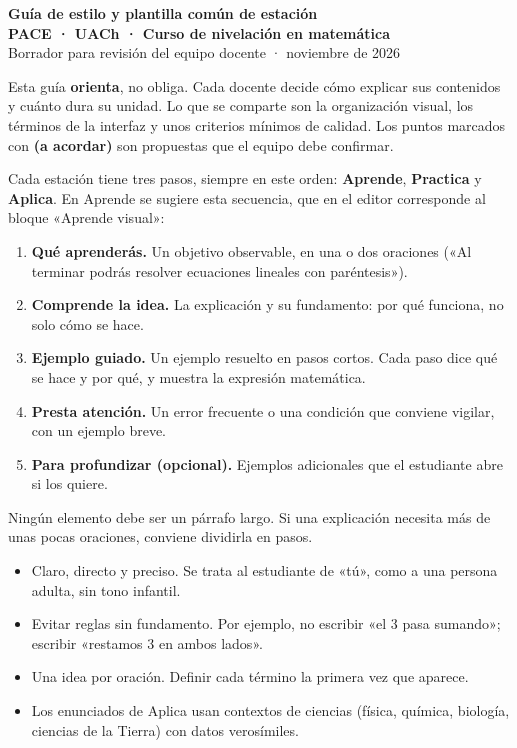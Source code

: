 \documentclass[11pt,a4paper]{article}
\newcommand{\seccion}[1]{\vspace{4pt}{\large\bfseries\color{navy}#1}\par\vspace{-2pt}}
\begin{document}
{\LARGE\bfseries\color{navy}Guía de estilo y plantilla común de estación}\\[2pt]
{\color{coral}\bfseries PACE · UACh · Curso de nivelación en matemática}\\[2pt]
{\small Borrador para revisión del equipo docente · noviembre de 2026}

\begin{aviso}
Esta guía \textbf{orienta}, no obliga. Cada docente decide cómo explicar sus contenidos y cuánto dura su unidad. Lo que se comparte son la organización visual, los términos de la interfaz y unos criterios mínimos de calidad. Los puntos marcados con \textbf{(a acordar)} son propuestas que el equipo debe confirmar.
\end{aviso}

\seccion{1. Estructura de una estación}
Cada estación tiene tres pasos, siempre en este orden: \textbf{Aprende}, \textbf{Practica} y \textbf{Aplica}. En Aprende se sugiere esta secuencia, que en el editor corresponde al bloque «Aprende visual»:
\begin{enumerate}
 \item \textbf{Qué aprenderás.} Un objetivo observable, en una o dos oraciones («Al terminar podrás resolver ecuaciones lineales con paréntesis»).
 \item \textbf{Comprende la idea.} La explicación y su fundamento: por qué funciona, no solo cómo se hace.
 \item \textbf{Ejemplo guiado.} Un ejemplo resuelto en pasos cortos. Cada paso dice qué se hace y por qué, y muestra la expresión matemática.
 \item \textbf{Presta atención.} Un error frecuente o una condición que conviene vigilar, con un ejemplo breve.
 \item \textbf{Para profundizar (opcional).} Ejemplos adicionales que el estudiante abre si los quiere.
\end{enumerate}
Ningún elemento debe ser un párrafo largo. Si una explicación necesita más de unas pocas oraciones, conviene dividirla en pasos.

\seccion{2. Lenguaje}
\begin{itemize}
 \item Claro, directo y preciso. Se trata al estudiante de «tú», como a una persona adulta, sin tono infantil.
 \item Evitar reglas sin fundamento. Por ejemplo, no escribir «el $3$ pasa sumando»; escribir «restamos $3$ en ambos lados».
 \item Una idea por oración. Definir cada término la primera vez que aparece.
 \item Los enunciados de Aplica usan contextos de ciencias (física, química, biología, ciencias de la Tierra) con datos verosímiles.
\end{itemize}
\end{document}
